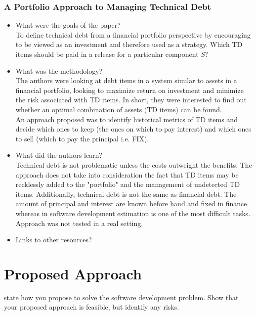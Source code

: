 \documentclass{mprop}
\begin{document}
\subsubsection{A Portfolio Approach to Managing Technical Debt} \cite{Guo2011}

\begin{itemize}
\item What were the goals of the paper?\\ 
To define technical debt from a financial portfolio perspective by encouraging to be viewed as an investment and therefore used as a strategy.
Which TD items should be paid in a release for a particular component \textit{S}?
\item What was the methodology?\\
The authors were looking at debt items in a system similar to assets in a financial portfolio, looking to maximize return on investment and minimize the risk associated with TD items.
In short, they were interested to find out whether an optimal combination of assets (TD items) can be found. \\
An approach proposed was to identify historical metrics of TD items and decide which ones to keep (the ones on which to pay interest) and which ones to sell (which to pay the principal i.e. FIX).
\item What did the authors learn? \\
Technical debt is not problematic unless the costs outweight the benefits.
The approach does not take into consideration the fact that TD items may be recklessly added to the "portfolio" and the management of undetected TD items.
Additionally, technical debt is not the same as financial debt. The amount of principal and interest are known before hand and fixed in finance whereas in software development estimation is one of the most difficult tasks.
Approach was not tested in a real setting. 
\item Links to other resources?
\end{itemize}


\section{Proposed Approach}

state how you propose to solve the software development problem. Show that your proposed approach is feasible, but identify any risks.

\end{document}
